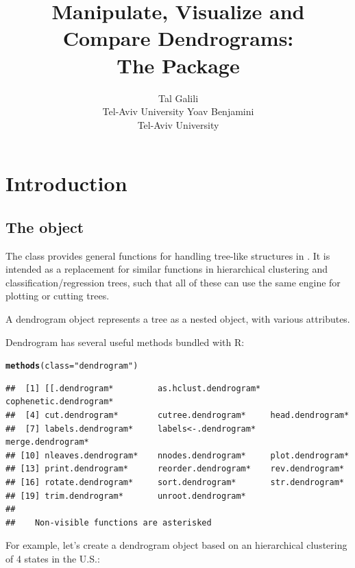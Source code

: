 \documentclass[shortnames,nojss,article]{jss}\usepackage{graphicx, color}
\author{Tal Galili\\Tel-Aviv University \And Yoav Benjamini\\Tel-Aviv University}
\title{Manipulate, Visualize and Compare Dendrograms:\\ The \pkg{dendextend} \proglang{R} Package}
\makeatletter
\newcommand{\hlfunctioncall}[1]{\textcolor[rgb]{0.501960784313725,0,0.329411764705882}{\textbf{#1}}}%
\newcommand{\hlstring}[1]{\textcolor[rgb]{0.6,0.6,1}{#1}}%
\newenvironment{kframe}{%
 \def\at@end@of@kframe{}%
 \ifinner\ifhmode%
  \def\at@end@of@kframe{\end{minipage}}%
  \begin{minipage}{\columnwidth}%
 \fi\fi%
 \def\FrameCommand##1{\hskip\@totalleftmargin \hskip-\fboxsep
 \colorbox{shadecolor}{##1}\hskip-\fboxsep
     \hskip-\linewidth \hskip-\@totalleftmargin \hskip\columnwidth}%
 \MakeFramed {\advance\hsize-\width
   \@totalleftmargin\z@ \linewidth\hsize
   \@setminipage}}%
 {\par\unskip\endMakeFramed%
 \at@end@of@kframe}
\newenvironment{knitrout}{}{} %
\makeatother
\begin{document}
\vspace*{-0.25cm}



\section{Introduction}

\subsection{The  object}

The  class provides general functions for handling tree-like structures in  \citep{R:Main}. It is intended as a replacement for similar functions in hierarchical clustering and classification/regression trees, such that all of these can use the same engine for plotting or cutting trees.

A dendrogram object represents a tree as a nested  object, with various attributes.

Dendrogram has several useful methods bundled with R:

\begin{knitrout}
\color{fgcolor}\begin{kframe}
\begin{alltt}
\hlfunctioncall{methods}(class = \hlstring{"dendrogram"})
\end{alltt}
\begin{verbatim}
##  [1] [[.dendrogram*         as.hclust.dendrogram*  cophenetic.dendrogram*
##  [4] cut.dendrogram*        cutree.dendrogram*     head.dendrogram*      
##  [7] labels.dendrogram*     labels<-.dendrogram*   merge.dendrogram*     
## [10] nleaves.dendrogram*    nnodes.dendrogram*     plot.dendrogram*      
## [13] print.dendrogram*      reorder.dendrogram*    rev.dendrogram*       
## [16] rotate.dendrogram*     sort.dendrogram*       str.dendrogram*       
## [19] trim.dendrogram*       unroot.dendrogram*    
## 
##    Non-visible functions are asterisked
\end{verbatim}
\end{kframe}
\end{knitrout}


For example, let's create a dendrogram object based on an hierarchical clustering of 4 states in the U.S.:
\end{document}
